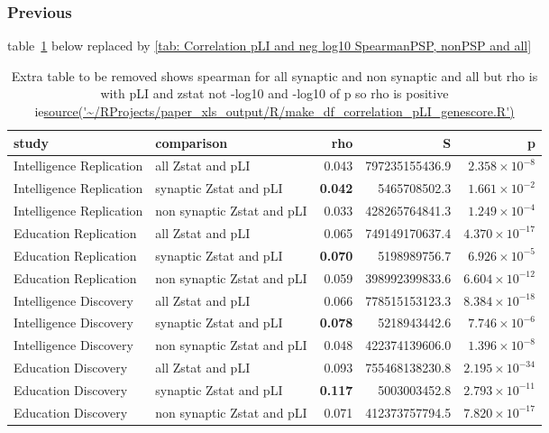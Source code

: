 \subsubsection{Previous}
table~\ref{tab:Extra table to be removed shows spearman for all synaptic and non synaptic and all but rho is with pLI and zstat not -log10 and -log10 of p  so rho is positive ie} below replaced by \ref{tab: Correlation pLI and neg log10 SpearmanPSP, nonPSP and all}
\begin{table}[ht]
\centering
\begin{adjustbox}{max width=\textwidth}
\begin{tabular}{llrrr}
  \hline
study & comparison & rho & S & p \\ 
  \hline
Intelligence Replication & all Zstat and pLI & 0.043 & 797235155436.9 & $2.358 \times 10^{-8}$ \\ 
  Intelligence Replication & synaptic Zstat and pLI & \textbf{0.042} & 5465708502.3 & $1.661 \times 10^{-2}$ \\ 
  Intelligence Replication & non synaptic Zstat and pLI & 0.033 & 428265764841.3 & $1.249 \times 10^{-4}$ \\ 
  Education Replication & all Zstat and pLI & 0.065 & 749149170637.4 & $4.370 \times 10^{-17}$ \\ 
  Education Replication & synaptic Zstat and pLI & \textbf{0.070} & 5198989756.7 & $6.926 \times 10^{-5}$ \\ 
  Education Replication & non synaptic Zstat and pLI & 0.059 & 398992399833.6 & $6.604 \times 10^{-12}$ \\ 
  Intelligence Discovery & all Zstat and pLI & 0.066 & 778515153123.3 & $8.384 \times 10^{-18}$ \\ 
  Intelligence Discovery & synaptic Zstat and pLI & \textbf{0.078} & 5218943442.6 & $7.746 \times 10^{-6}$ \\ 
  Intelligence Discovery & non synaptic Zstat and pLI & 0.048 & 422374139606.0 & $1.396 \times 10^{-8}$ \\ 
  Education Discovery & all Zstat and pLI & 0.093 & 755468138230.8 & $2.195 \times 10^{-34}$ \\ 
  Education Discovery & synaptic Zstat and pLI & \textbf{0.117} & 5003003452.8 & $2.793 \times 10^{-11}$ \\ 
  Education Discovery & non synaptic Zstat and pLI & 0.071 & 412373757794.5 & $7.820 \times 10^{-17}$ \\ 
   \hline
\end{tabular}
\end{adjustbox}
\caption{Extra table to be removed shows spearman for all synaptic and non synaptic and all but rho is with pLI and zstat not -log10 and -log10 of p  so rho is positive ie\url{source('~/RProjects/paper_xls_output/R/make_df_correlation_pLI_genescore.R')}}
\label{tab:Extra table to be removed shows spearman for all synaptic and non synaptic and all but rho is with pLI and zstat not -log10 and -log10 of p  so rho is positive ie}
\end{table}



